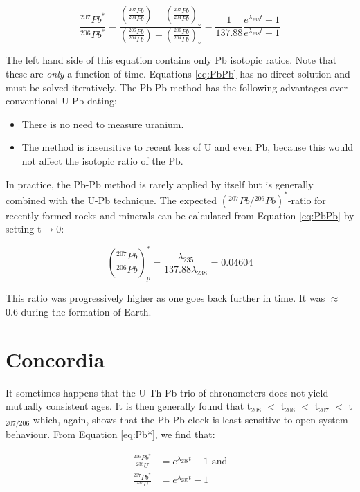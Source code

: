 \documentclass{book}
\begin{document}
\begin{equation}
\frac{^{207}Pb^*}{^{206}Pb^*} = 
\frac{\left(\frac{^{207}Pb}{^{204}Pb}\right)-\left(\frac{^{207}Pb}{^{204}Pb}\right)_\circ}
{\left(\frac{^{206}Pb}{^{204}Pb}\right)-\left(\frac{^{206}Pb}{^{204}Pb}\right)_\circ}
= \frac{1}{137.88} \frac{e^{\lambda_{235}t}-1}{e^{\lambda_{238}t}-1}
\label{eq:PbPb}
\end{equation}

The left hand side of this equation contains only Pb isotopic ratios.
Note that these are \emph{only} a function of time. Equations
\ref{eq:PbPb} has no direct solution and must be solved
iteratively. The Pb-Pb method has the following advantages over
conventional U-Pb dating:

\begin{itemize}
\item There is no need to measure uranium.
\item The method is insensitive to recent loss of U and even Pb,
  because this would not affect the isotopic ratio of the Pb.
\end{itemize}

In practice, the Pb-Pb method is rarely applied by itself but is
generally combined with the U-Pb technique. The expected
$({}^{207}Pb/{}^{206}Pb)^*$-ratio for recently formed rocks and minerals
can be calculated from Equation \ref{eq:PbPb} by setting
t$\rightarrow$0:

\begin{equation}
  \left(\frac{^{207}Pb}{^{206}Pb}\right)^*_p =
  \frac{\lambda_{235}}{137.88\lambda_{238}} = 0.04604
\label{eq:commonPb}
\end{equation}

This ratio was progressively higher as one goes back further in time.
It was $\approx$ 0.6 during the formation of Earth.

\section{Concordia}
\label{sec:concordia}

It sometimes happens that the U-Th-Pb trio of chronometers does not
yield mutually consistent ages. It is then generally found that
t$_{208}$ $<$ t$_{206}$ $<$ t$_{207}$ $<$ t$_{207/206}$ which, again,
shows that the Pb-Pb clock is least sensitive to open system
behaviour.  From Equation \ref{eq:Pb*}, we find that:

\begin{equation}
\begin{array}{rl}
\frac{^{206}Pb^*}{^{238}U} & = e^{\lambda_{238}t}-1 \mbox{~and}\\
\frac{^{207}Pb^*}{^{235}U} & = e^{\lambda_{235}t}-1
\end{array}
\label{eq:wetherill}
\end{equation}
\end{document}
